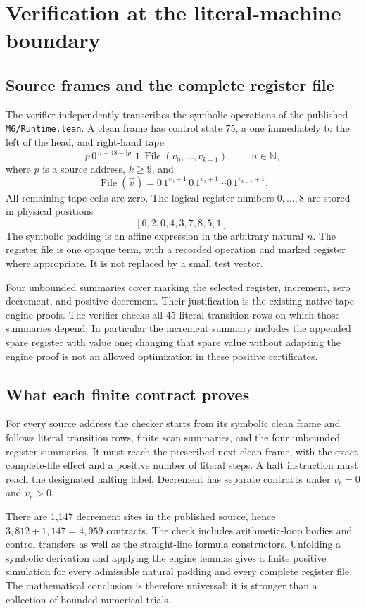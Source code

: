 \documentclass[11pt,letterpaper]{article}
\begin{document}


\section{Verification at the literal-machine boundary}
\label{sec:verification}
\subsection{Source frames and the complete register file}
The verifier independently transcribes the symbolic operations of the
published \texttt{M6/Runtime.lean}. A clean frame has control state 75, a
one immediately to the left of the head, and right-hand tape
\[
 p\,0^{\,n+48-|p|}\,1\,\operatorname{File}(v_0,\ldots,v_{k-1}),
 \qquad n\in\mathbb N,
\]
where $p$ is a source address, $k\geq9$, and
\[
 \operatorname{File}(\vec v)=
  0\,1^{v_0+1}\,0\,1^{v_1+1}\cdots0\,1^{v_{k-1}+1}.
\]
All remaining tape cells are zero. The logical register numbers $0,\ldots,8$
are stored in physical positions
\[
                  [6,2,0,4,3,7,8,5,1].
\]
The symbolic padding is an affine expression in the arbitrary natural $n$.
The register file is one opaque term, with a recorded operation and marked
register where appropriate. It is not replaced by a small test vector.

Four unbounded summaries cover marking the selected register, increment,
zero decrement, and positive decrement. Their justification is the existing
native tape-engine proofs. The verifier checks all 45 literal transition
rows on which those summaries depend. In particular the increment summary
includes the appended spare register with value one; changing that spare
value without adapting the engine proof is not an allowed optimization in
these positive certificates.

\subsection{What each finite contract proves}
For every source address the checker starts from its symbolic clean frame
and follows literal transition rows, finite scan summaries, and the four
unbounded register summaries. It must reach the prescribed next clean frame,
with the exact complete-file effect and a positive number of literal steps.
A halt instruction must reach the designated halting label. Decrement has
separate contracts under $v_r=0$ and $v_r>0$.

There are 1,147 decrement sites in the published source, hence
$3,812+1,147=4,959$ contracts. The check includes arithmetic-loop bodies and
control transfers as well as the straight-line formula constructors.
Unfolding a symbolic derivation and applying the engine lemmas gives a
finite positive simulation for every admissible natural padding and every
complete register file. The mathematical conclusion is therefore universal;
it is stronger than a collection of bounded numerical trials.
\end{document}
